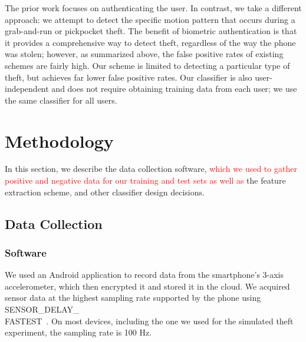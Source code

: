 The prior work focuses on authenticating the user.
In contrast, we take a different approach: we attempt to detect the
specific motion pattern that occurs during a grab-and-run or pickpocket theft.
The benefit of biometric authentication is that it provides a comprehensive
way to detect theft, regardless of the way the phone was stolen; however,
as summarized above, the false positive rates of existing schemes
are fairly high.
Our scheme is limited to detecting a particular type of theft, but achieves
far lower false positive rates.
Our classifier is also user-independent and does not require obtaining
training data from each user; we use the same classifier for all users.




\section{Methodology}

In this section, we describe the data collection software, \textcolor{red}{which we used to gather positive and negative data for our training and test sets as well as} the feature extraction scheme, and other classifier design decisions.

\subsection{Data Collection}

\subsubsection{Software}
We used an Android application to record data from the smartphone's 3-axis accelerometer, which then encrypted it and stored it in the cloud.
We acquired sensor data at the highest sampling rate supported by the phone using SENSOR\_DELAY\_\\FASTEST~\cite{android:doc}. 
On most devices, including the one we used for the simulated theft experiment, the sampling rate is 100 Hz. 

